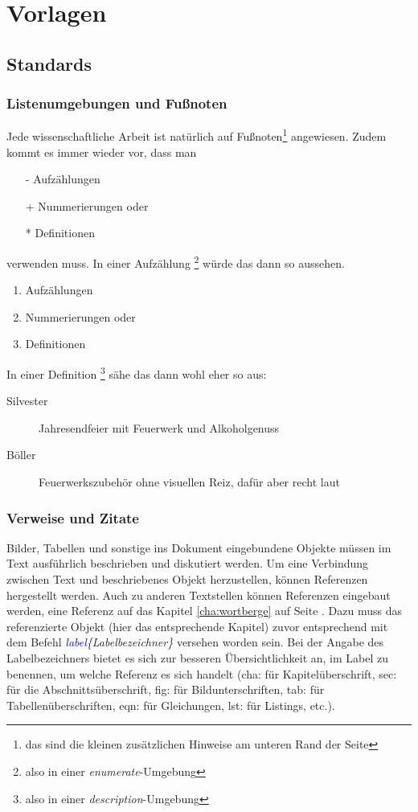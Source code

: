 \chapter{Vorlagen}
\label{cha:Vorlagen}

\section{Standards}
\subsection{Listenumgebungen und Fußnoten}
Jede wissenschaftliche Arbeit ist natürlich auf Fußnoten\footnote{das sind die kleinen zusätzlichen Hinweise am unteren Rand der Seite} angewiesen. Zudem kommt es immer wieder vor, dass man 
\begin{itemize}
\item[-] Aufzählungen
\item[+] Nummerierungen oder
\item[*] Definitionen 
\end{itemize}
verwenden muss. In einer Aufzählung \footnote{also in einer \textit{enumerate}-Umgebung} würde das dann so aussehen.
\begin{enumerate}
\item Aufzählungen
\item Nummerierungen oder
\item Definitionen 
\end{enumerate}

In einer Definition \footnote{also in einer \textit{description}-Umgebung} sähe das dann wohl eher so aus:

\begin{description}
\item[Silvester] Jahresendfeier mit Feuerwerk und Alkoholgenuss
\item[Böller] Feuerwerkszubehör ohne visuellen Reiz, dafür aber recht laut
\end{description}

\subsection{Verweise und Zitate}

Bilder, Tabellen und sonstige ins Dokument eingebundene Objekte müssen im Text ausführlich beschrieben und diskutiert werden. Um eine Verbindung zwischen Text und beschriebenes Objekt herzustellen, können Referenzen hergestellt werden. Auch zu anderen Textstellen können Referenzen eingebaut werden, \zB eine Referenz auf das Kapitel \ref{cha:wortberge} auf Seite \pageref{cha:wortberge}. Dazu muss das referenzierte Objekt (hier das entsprechende Kapitel) zuvor entsprechend mit dem Befehl \textit{\bs \textcolor{blue}{label}\{Labelbezeichner\}} versehen worden sein. Bei der Angabe des Labelbezeichners bietet es sich zur besseren Übersichtlichkeit an, im Label zu benennen, um welche Referenz es sich handelt (cha: für Kapitelüberschrift, sec: für die Abschnittsüberschrift, fig: für Bildunterschriften, tab: für Tabellenüberschriften, eqn: für Gleichungen, lst: für Listings, etc.).


